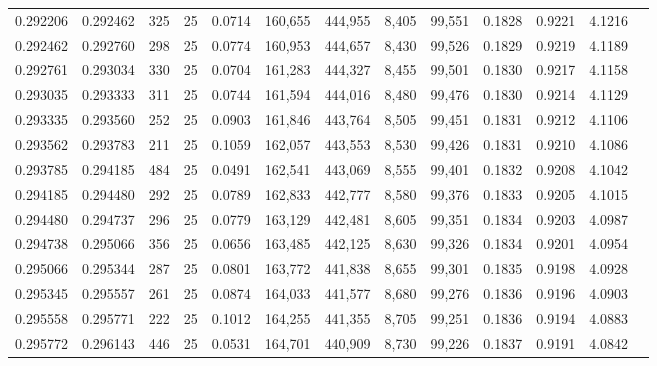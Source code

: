 \begin{tabular}{rrrrrrrrrrrrr}
0.292206 & 0.292462 &   325 &  25 &                                     0.0714 & 160,655 & 444,955 &   8,405 &  99,551 & 0.1828 & 0.9221 & 4.1216 \\
0.292462 & 0.292760 &   298 &  25 &                                     0.0774 & 160,953 & 444,657 &   8,430 &  99,526 & 0.1829 & 0.9219 & 4.1189 \\
0.292761 & 0.293034 &   330 &  25 &                                     0.0704 & 161,283 & 444,327 &   8,455 &  99,501 & 0.1830 & 0.9217 & 4.1158 \\
0.293035 & 0.293333 &   311 &  25 &                                     0.0744 & 161,594 & 444,016 &   8,480 &  99,476 & 0.1830 & 0.9214 & 4.1129 \\
0.293335 & 0.293560 &   252 &  25 &                                     0.0903 & 161,846 & 443,764 &   8,505 &  99,451 & 0.1831 & 0.9212 & 4.1106 \\
0.293562 & 0.293783 &   211 &  25 &                                     0.1059 & 162,057 & 443,553 &   8,530 &  99,426 & 0.1831 & 0.9210 & 4.1086 \\
0.293785 & 0.294185 &   484 &  25 &                                     0.0491 & 162,541 & 443,069 &   8,555 &  99,401 & 0.1832 & 0.9208 & 4.1042 \\
0.294185 & 0.294480 &   292 &  25 &                                     0.0789 & 162,833 & 442,777 &   8,580 &  99,376 & 0.1833 & 0.9205 & 4.1015 \\
0.294480 & 0.294737 &   296 &  25 &                                     0.0779 & 163,129 & 442,481 &   8,605 &  99,351 & 0.1834 & 0.9203 & 4.0987 \\
0.294738 & 0.295066 &   356 &  25 &                                     0.0656 & 163,485 & 442,125 &   8,630 &  99,326 & 0.1834 & 0.9201 & 4.0954 \\
0.295066 & 0.295344 &   287 &  25 &                                     0.0801 & 163,772 & 441,838 &   8,655 &  99,301 & 0.1835 & 0.9198 & 4.0928 \\
0.295345 & 0.295557 &   261 &  25 &                                     0.0874 & 164,033 & 441,577 &   8,680 &  99,276 & 0.1836 & 0.9196 & 4.0903 \\
0.295558 & 0.295771 &   222 &  25 &                                     0.1012 & 164,255 & 441,355 &   8,705 &  99,251 & 0.1836 & 0.9194 & 4.0883 \\
0.295772 & 0.296143 &   446 &  25 &                                     0.0531 & 164,701 & 440,909 &   8,730 &  99,226 & 0.1837 & 0.9191 & 4.0842 \\

\end{tabular}

